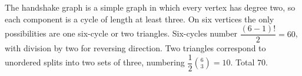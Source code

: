 The handshake graph is a simple graph in which every vertex has degree two, so each component is a cycle of length at least three. On six vertices the only possibilities are one six-cycle or two triangles. Six-cycles number $\dfrac{(6-1)!}{2}=60$, with division by two for reversing direction. Two triangles correspond to unordered splits into two sets of three, numbering $\dfrac{1}{2}\binom63=10$. Total $\boxed{70}$.
